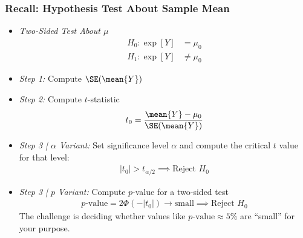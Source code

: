 

\begin{frame}
\frametitle{Recall: Hypothesis Test About Sample Mean}
\begin{itemize}
\item \emph{Two-Sided Test About $\mu$}
\begin{align*}
H_{0} \colon \exp[Y] & = \mu_{0}\\
H_{1} \colon \exp[Y] & \ne \mu_{0}
\end{align*}
\item \emph{Step 1:}
Compute $\SE(\mean{Y})$
\item \emph{Step 2:} 
Compute $t$-statistic
\begin{align*}
t_{0} = \frac{\mean{Y}-\mu_{0}}{\SE(\mean{Y})}
\end{align*}
\item \emph{Step 3 | $\alpha$ Variant:} 
Set significance level $\alpha$ and compute the critical $t$ value for that level:
\begin{align*}
|t_{0}| > t_{\alpha/2}
\implies 
\text{Reject $H_{0}$}
\end{align*}
\item \emph{Step 3 | $p$ Variant:} 
Compute $p$-value for a two-sided test
\begin{align*}
\text{$p$-value} = 2 \Phi(-|t_{0}|)
\to \text{small}
\implies 
\text{Reject $H_{0}$}
\end{align*}
The challenge is deciding whether values like $p\text{-value} \approx 5\%$ are ``small'' for your purpose.
\end{itemize}
\end{frame}


